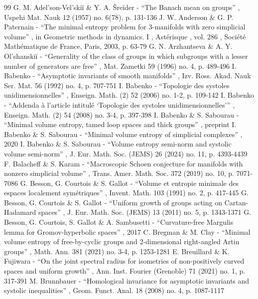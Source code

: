 \documentclass[10pt]{amsart}
\theoremstyle{definition}
\begin{document}
\begin{thebibliography}{99}
 G. M. Adel’son-Vel’skiĭ \& Y. A. Šreĭder - “The Banach mean on groups” , Uspehi Mat. Nauk 12 (1957) no. 6(78), p. 131-136
 J. W. Anderson \& G. P. Paternain - “The minimal entropy problem for 3-manifolds with zero simplicial volume” , in Geometric methods in dynamics. I , Astérisque , vol. 286 , Société Mathématique de France, Paris, 2003, p. 63-79
 G. N. Arzhantseva \& A. Y. Ol’shanskiĭ - “Generality of the class of groups in which subgroups with a lesser number of generators are free” , Mat. Zametki 59 (1996) no. 4, p. 489-496
 I. Babenko - “Asymptotic invariants of smooth manifolds” , Izv. Ross. Akad. Nauk Ser. Mat. 56 (1992) no. 4, p. 707-751
 I. Babenko - “Topologie des systoles unidimensionnelles” , Enseign. Math. (2) 52 (2006) no. 1-2, p. 109-142
 I. Babenko - “Addenda à l’article intitulé ‘Topologie des systoles unidimensionnelles’” , Enseign. Math. (2) 54 (2008) no. 3-4, p. 397-398
 I. Babenko \& S. Sabourau - “Minimal volume entropy, tamed loop spaces and thick groups” , preprint
 I. Babenko \& S. Sabourau - “Minimal volume entropy of simplicial complexes” , 2020
 I. Babenko \& S. Sabourau - “Volume entropy semi-norm and systolic volume semi-norm” , J. Eur. Math. Soc. (JEMS) 26 (2024) no. 11, p. 4393-4439
 F. Balacheff \& S. Karam - “Macroscopic Schoen conjecture for manifolds with nonzero simplicial volume” , Trans. Amer. Math. Soc. 372 (2019) no. 10, p. 7071-7086
 G. Besson, G. Courtois \& S. Gallot - “Volume et entropie minimale des espaces localement symétriques” , Invent. Math. 103 (1991) no. 2, p. 417-445
 G. Besson, G. Courtois \& S. Gallot - “Uniform growth of groups acting on Cartan-Hadamard spaces” , J. Eur. Math. Soc. (JEMS) 13 (2011) no. 5, p. 1343-1371
 G. Besson, G. Courtois, S. Gallot \& A. Sambusetti - “Curvature-free Margulis lemma for Gromov-hyperbolic spaces” , 2017
 C. Bregman \& M. Clay - “Minimal volume entropy of free-by-cyclic groups and 2-dimensional right-angled Artin groups” , Math. Ann. 381 (2021) no. 3-4, p. 1253-1281
 E. Breuillard \& K. Fujiwara - “On the joint spectral radius for isometries of non-positively curved spaces and uniform growth” , Ann. Inst. Fourier (Grenoble) 71 (2021) no. 1, p. 317-391
 M. Brunnbauer - “Homological invariance for asymptotic invariants and systolic inequalities” , Geom. Funct. Anal. 18 (2008) no. 4, p. 1087-1117

\end{thebibliography}
\end{document}
